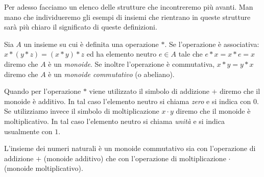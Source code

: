 Per adesso facciamo un elenco delle strutture che incontreremo più avanti. 
Man mano che individueremo gli esempi di insiemi che rientrano in queste strutture
sarà più chiaro il significato di queste definizioni.

\begin{definition}[monoide]%
  \label{def:monoide}%
  Sia $A$ un insieme su cui è definita una operazione $*$.
  Se l'operazione è associativa: $x*(y*z) = (x*y)*z$ 
  ed ha elemento neutro $e\in A$ tale che $e*x = x*e = x$
  diremo che $A$ è un \emph{monoide}.
  Se inoltre l'operazione è commutativa, $x*y=y*x$ 
  diremo che $A$ è un \emph{monoide commutativo} (o abeliano).
  
  Quando per l'operazione $*$ viene utilizzato il simbolo di addizione $+$
  diremo che il monoide è additivo. In tal caso l'elemento neutro 
  si chiama \emph{zero} e si indica con $0$.
  Se utilizziamo invece il simbolo di moltiplicazione $x\cdot y$
  diremo che il monoide è moltiplicativo. In tal caso l'elemento 
  neutro si chiama \emph{unità} e si indica usualmente con $1$.
  \end{definition}
  
  \begin{example}
  L'insieme dei numeri naturali è un monoide commutativo sia con l'operazione di addizione $+$ 
  (monoide additivo) che con l'operazione di moltiplicazione 
  $\cdot$ (monoide moltiplicativo).
  \end{example}
  
